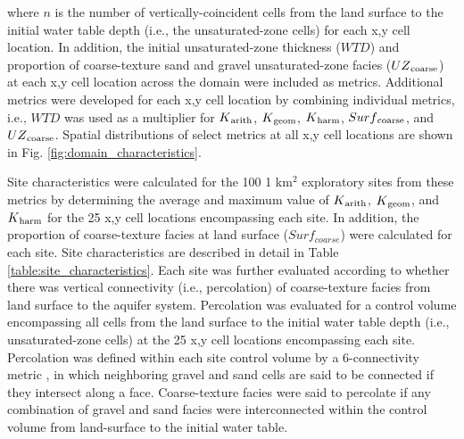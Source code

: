 \noindent where $n$ is the number of vertically-coincident cells from the land surface to the initial water table depth (i.e., the unsaturated-zone cells) for each x,y cell location. In addition, the initial unsaturated-zone thickness ($WTD$) and proportion of coarse-texture sand and gravel unsaturated-zone facies ($UZ\textsubscript{coarse}$) at each x,y cell location across the domain were included as metrics. Additional metrics were developed for each x,y cell location by combining individual metrics, i.e., $WTD$ was used as a multiplier for $K\textsubscript{arith}$, $K\textsubscript{geom}$, $K\textsubscript{harm}$, $Surf\textsubscript{coarse}$, and $UZ\textsubscript{coarse}$. Spatial distributions of select metrics at all x,y cell locations are shown in Fig. \ref{fig:domain_characteristics}.

Site characteristics were calculated for the 100 1 km$^2$ exploratory sites from these metrics by determining the average and maximum value of $K\textsubscript{arith}$, $K\textsubscript{geom}$, and $K\textsubscript{harm}$ for the 25 x,y cell locations encompassing each site. In addition, the proportion of coarse-texture facies at land surface ($Surf_{coarse}$) were calculated for each site. Site characteristics are described in detail in Table \ref{table:site_characteristics}. Each site was further evaluated according to whether there was vertical connectivity (i.e., percolation) of coarse-texture facies from land surface to the aquifer system. Percolation was evaluated for a control volume encompassing all cells from the land surface to the initial water table depth (i.e., unsaturated-zone cells) at the 25 x,y cell locations encompassing each site. Percolation was defined within each site control volume by a 6-connectivity metric \citep{pardo2003connec3d}, in which neighboring gravel and sand cells are said to be connected if they intersect along a face. Coarse-texture facies were said to percolate if any combination of gravel and sand facies were interconnected within the control volume from land-surface to the initial water table.



